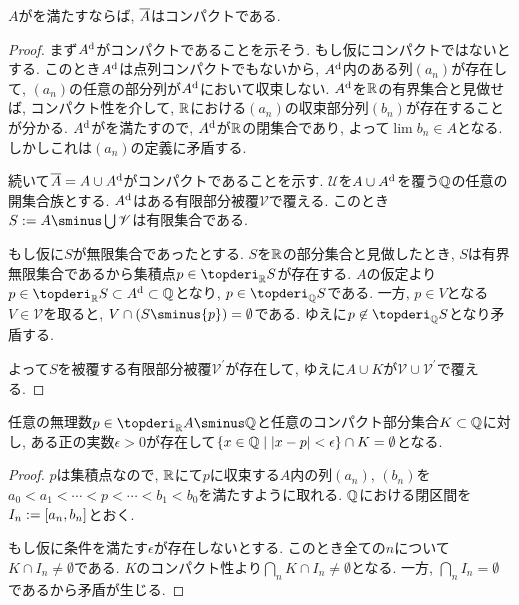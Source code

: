 \documentclass[uplatex, dvipdfmx, a4paper, 12pt]{jsarticle}
\theoremstyle{plain}
\theoremstyle{nonumberplain}
\newtheorem{proof}{証明}
\begin{document}
\begin{lemma}
	$ A $がを満たすならば, $ \overline{A} $はコンパクトである.
\end{lemma}
\begin{proof}
	まず$ A^{\mathrm{d}} $がコンパクトであることを示そう. もし仮にコンパクトではないとする. このとき$ A^{\mathrm{d}} $は点列コンパクトでもないから, $ A^{\mathrm{d}} $内のある列$ (a_n) $が存在して, $ (a_n) $の任意の部分列が$ A^{\mathrm{d}} $において収束しない. $ A^{\mathrm{d}} $を$ \mathbb{R} $の有界集合と見做せば, コンパクト性を介して, $ \mathbb{R} $における$ (a_n) $の収束部分列$ (b_n) $が存在することが分かる. $ A^{\mathrm{d}} $がを満たすので, $ A^{\mathrm{d}} $が$ \mathbb{R} $の閉集合であり, よって$ \lim b_n \in A $となる. しかしこれは$ (a_n) $の定義に矛盾する.

	続いて$ \overline{A} = A \cup A^{\mathrm{d}} $がコンパクトであることを示す. $ \mathscr{U} $を$ A \cup A^{\mathrm{d}} $を覆う$ \mathbb{Q} $の任意の開集合族とする. $ A^{\mathrm{d}} $はある有限部分被覆$ \mathscr{V} $で覆える. このとき$ S \defeq A \sminus \bigcup \mathscr{V} $は有限集合である.
	 \begin{hosoku}
		もし仮に$ S $が無限集合であったとする. $ S $を$ \mathbb{R} $の部分集合と見做したとき, $ S $は有界無限集合であるから集積点$ p \in \topderi_{\R} S $が存在する. $ A $の仮定より$ p \in \topderi_{\R} S \subset A^\topd \subset \Q $となり, $ p \in \topderi_{\Q} S $である. 一方, $ p \in V $となる$ V \in \mathscr{V} $を取ると, $ V \cap (S \sminus \{p\}) = \emptyset $である. ゆえに$ p \not\in \topderi_{\Q} S $となり矛盾する.
	 \end{hosoku}
	 \noindent
	 よって$ S $を被覆する有限部分被覆$ \mathscr{V}^\prime $が存在して, ゆえに$ A \cup K $が$ \mathscr{V} \cup \mathscr{V}^\prime $で覆える.
\end{proof}

\begin{lemma}
	任意の無理数$ p \in \topderi_{\R} A \sminus \Q $と任意のコンパクト部分集合$ K \subset \mathbb{Q} $に対し, ある正の実数$ \epsilon > 0 $が存在して$ \setcomp{x \in \Q}{| x- p | < \epsilon} \cap K = \emptyset $となる.
\end{lemma}
\begin{proof}
	$ p $は集積点なので, $ \mathbb{R} $にて$ p $に収束する$ A $内の列$ (a_n) $, $ (b_n) $を$ a_0 < a_1 < \cdots < p < \cdots < b_1 < b_0 $を満たすように取れる. $ \mathbb{Q} $における閉区間を$ I_n \mathrel{:=} [a_n, b_n] $とおく.

	もし仮に条件を満たす$ \epsilon $が存在しないとする. このとき全ての$ n $について$ K \cap I_n  \neq \emptyset $である. $ K $のコンパクト性より$ \bigcap_n K \cap I_n \neq \emptyset  $となる. 一方, $ \bigcap_n I_n = \emptyset $であるから矛盾が生じる.
\end{proof}
\end{document}
